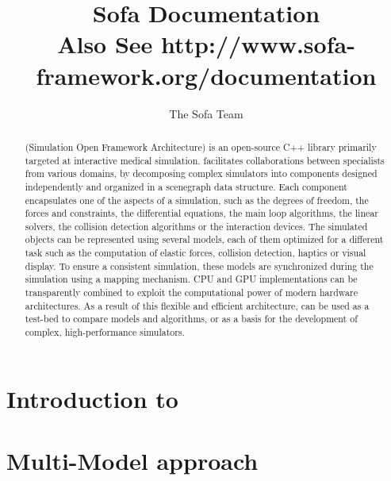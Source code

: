 \documentclass[a4paper,10pt]{report}
\title{Sofa Documentation\\
\vspace{10mm}\normalsize{Also See \bf{http://www.sofa-framework.org/documentation} } }
\author{The Sofa Team}
\begin{document}
\maketitle

\begin{abstract}	
\sofa{} (Simulation Open Framework Architecture) is an open-source C++ library primarily  targeted at interactive medical simulation.
\sofa{} facilitates collaborations between specialists from various domains, by decomposing complex simulators into components designed independently and organized in a scenegraph data structure.
Each component encapsulates one of the aspects of a simulation, such as the degrees of freedom, the forces and constraints, the differential equations, the main loop algorithms, the linear solvers, the collision detection algorithms or the interaction devices. The simulated objects can be represented using several models, each of them optimized for a different task such as the computation of elastic forces, collision detection, haptics or visual display. To ensure a consistent simulation, these models are synchronized during the simulation using a mapping mechanism.
CPU and GPU implementations can be transparently combined to exploit the computational power of modern hardware architectures.
As a result of this flexible and efficient architecture, \sofa{} can be used as a test-bed to compare models and algorithms, or as a basis for the development of complex, high-performance simulators.

\end{abstract}

\tableofcontents

\chapter{Introduction to \sofa}

\graphicspath{{../introduction/}}  %


\chapter{Multi-Model approach}
\graphicspath{{../multimodel/}}  %


\end{document}
